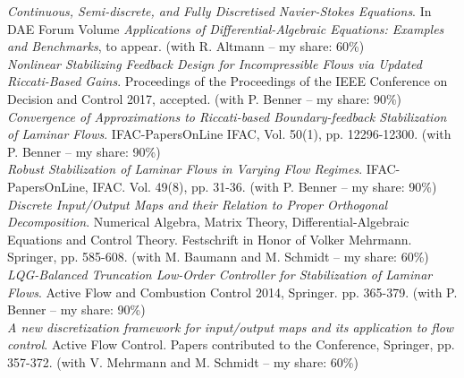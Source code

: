  \emph{Continuous, Semi-discrete, and Fully Discretised Navier-Stokes Equations}. In DAE Forum Volume \emph{Applications of Differential-Algebraic Equations: Examples and Benchmarks}, to appear. (with R. Altmann -- my share: 60\%) \\

 \emph{Nonlinear Stabilizing Feedback Design for Incompressible Flows via Updated Riccati-Based Gains}. Proceedings of the Proceedings of the IEEE Conference on Decision and Control 2017, accepted. (with P. Benner -- my share: 90\%) \\ 

 \emph{Convergence of Approximations to Riccati-based Boundary-feedback Stabilization of Laminar Flows}. IFAC-PapersOnLine IFAC, Vol. 50(1), pp. 12296-12300. (with P. Benner -- my share: 90\%)\\

 \emph{Robust Stabilization of Laminar Flows in Varying Flow Regimes}. IFAC-PapersOnLine, IFAC. Vol. 49(8), pp. 31-36. (with P. Benner -- my share: 90\%)\\

 \emph{Discrete Input/Output Maps and their Relation to Proper Orthogonal Decomposition}. Numerical Algebra, Matrix Theory, Differential-Algebraic Equations and Control Theory. Festschrift in Honor of Volker Mehrmann. Springer, pp. 585-608. (with M. Baumann and M. Schmidt -- my share: 60\%) \\

 \emph{LQG-Balanced Truncation Low-Order Controller for Stabilization of Laminar Flows}. Active Flow and Combustion Control 2014, Springer. pp. 365-379. (with P. Benner -- my share: 90\%) \\

 \emph{A new discretization framework for input/output maps and its application to flow control}. Active Flow Control. Papers contributed to the Conference, Springer, pp. 357-372. (with V. Mehrmann and M. Schmidt -- my share: 60\%) 


